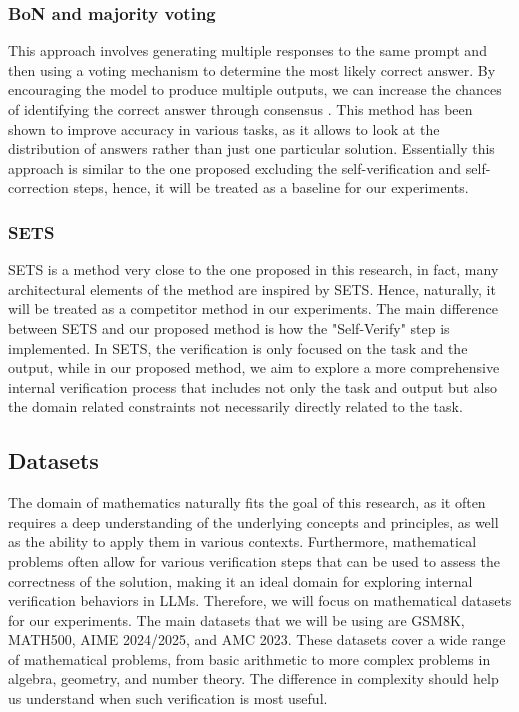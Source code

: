 \documentclass{article}
\begin{document}
\subsubsection{BoN and majority voting}
This approach involves generating multiple responses to the same prompt and then using a voting mechanism to determine the most likely correct answer. By encouraging the model to produce multiple outputs, we can increase the chances of identifying the correct answer through consensus \citep{wang2023selfconsistencyimproveschainthought}. This method has been shown to improve accuracy in various tasks, as it allows to look at the distribution of answers rather than just one particular solution. Essentially this approach is similar to the one proposed excluding the self-verification and self-correction steps, hence, it will be treated as a baseline for our experiments.


\subsubsection{SETS}
SETS is a method very close to the one proposed in this research, in fact, many architectural elements of the method are inspired by SETS. Hence, naturally, it will be treated as a competitor method in our experiments. The main difference between SETS and our proposed method is how the "Self-Verify" step is implemented. In SETS, the verification is only focused on the task and the output, while in our proposed method, we aim to explore a more comprehensive internal verification process that includes not only the task and output but also the domain related constraints not necessarily directly related to the task.


\subsection{Datasets}
The domain of mathematics naturally fits the goal of this research, as it often requires a deep understanding of the underlying concepts and principles, as well as the ability to apply them in various contexts. Furthermore, mathematical problems often allow for various verification steps that can be used to assess the correctness of the solution, making it an ideal domain for exploring internal verification behaviors in LLMs. Therefore, we will focus on mathematical datasets for our experiments. The main datasets that we will be using are GSM8K, MATH500, AIME 2024/2025, and AMC 2023. These datasets cover a wide range of mathematical problems, from basic arithmetic to more complex problems in algebra, geometry, and number theory. The difference in complexity should help us understand when such verification is most useful.
\end{document}
